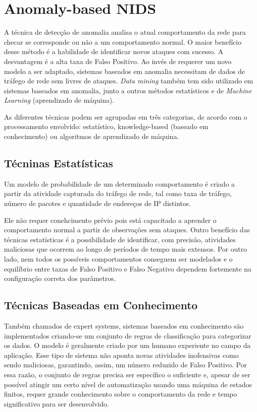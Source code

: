\chapter{Anomaly-based NIDS}
\label{ch:anids}
 A técnica de detecção de anomalia analisa o atual comportamento da rede para checar se corresponde ou não a um
 comportamento normal. O maior benefício desse método é a habilidade de identificar novos ataques com sucesso.
 A desvantagem é a alta taxa de Falso Positivo. Ao invés de requerer um novo modelo a ser adaptado, sistemas baseados
 em anomalia necessitam de dados de tráfego de rede sem livres de ataques. \textit{Data mining} também tem sido
 utilizado em sistemas baseados em anomalia, junto a outros métodos estatísticos e de \textit{Machine Learning}
 (aprendizado de máquina).
 \par As diferentes técnicas podem ser agrupadas em três categorias, de acordo com o processamento envolvido:
 estatístico, knowledge-based (baseado em conhecimento) ou algoritmos de aprendizado de máquina.

\section{Técninas Estatísticas}
Um modelo de probabilidade de um determinado comportamento é criado a partir da atividade capturada do tráfego de rede,
 tal como taxa de tráfego, número de pacotes e quantidade de endereços de IP distintos.
 \par Ele não requer conehcimento prévio pois está capacitado a aprender o comportamento normal a partir de observações
 sem ataques. Outro benefício das técnicas estatísticas é a possibilidade de identificar, com precisão, atividades
 maliciosas que ocorrem ao longo de períodos de tempo mais extensos. Por outro lado, nem todos os possíveis
 comportamentos conseguem ser modelados e o equilíbrio entre taxas de Falso Positivo e Falso Negativo dependem
 fortemente na configuração correta dos parâmetros.

 \section{Técnicas Baseadas em Conhecimento}
 Também chamados de expert systems, sistemas baseados em conhecimento são implementados criando-se um conjunto de
 regras de classificação para categorizar os dados. O modelo é geralmente criado por um humano experiente no campo
 da aplicação. Esse tipo de sistema não aponta novas atividades inofensivas como sendo maliciosas, garantindo, assim,
 um número reduzido de Falso Positivo. Por essa razão, o conjunto de regras precisa ser específico o suficiente e,
 apesar de ser possível atingir um certo nível de automatização usando uma máquina de estados finitos, requer
 grande conhecimento sobre o comportamento da rede e tempo significativo para ser desenvolvido.

